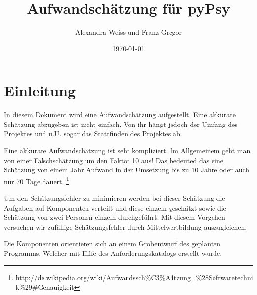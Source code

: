\documentclass[a4paper]{scrartcl}
\title{Aufwandschätzung für pyPsy}
\author{Alexandra Weiss und Franz Gregor}
\date{\today}
\begin{document}
\maketitle
\pagebreak
\section{Einleitung}
In diesem Dokument wird eine Aufwandschätzung aufgestellt. Eine akkurate Schätzung abzugeben ist nicht einfach. Von ihr hängt jedoch der Umfang des Projektes und u.U. sogar das Stattfinden des Projektes ab.

Eine akkurate Aufwandschätzung ist sehr kompliziert. Im Allgemeinem geht man von einer Falschschätzung um den Faktor 10 aus! Das bedeuted das eine Schätzung von einem Jahr Aufwand in der Umsetzung bis zu 10 Jahre oder auch nur 70 Tage dauert. \footnote{http://de.wikipedia.org/wiki/Aufwandssch\%C3\%A4tzung\_\%28Softwaretechnik\%29\#Genauigkeit}

Um den Schätzungsfehler zu minimieren werden bei dieser Schätzung die Aufgaben auf Komponenten verteilt und diese einzeln geschätzt sowie die Schätzung von zwei Personen einzeln durchgeführt. Mit diesem Vorgehen versuchen wir zufällige Schätzungsfehler durch Mittelwertbildung auszugleichen.

Die Komponenten orientieren sich an einem Grobentwurf des geplanten Programms. Welcher mit Hilfe des Anforderungskatalogs erstellt wurde.
\end{document}
